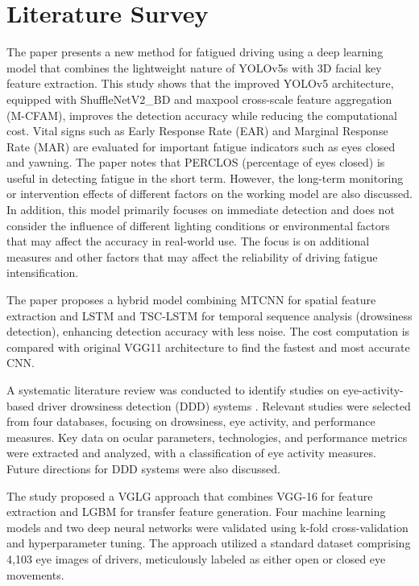 \chapter{Literature Survey}

The paper \cite{ran2023} presents a new method for fatigued driving using a deep learning model that combines the lightweight nature of YOLOv5s with 3D facial key feature extraction. This study shows that the improved YOLOv5 architecture, equipped with ShuffleNetV2\_BD and maxpool cross-scale feature aggregation (M-CFAM), improves the detection accuracy while reducing the computational cost. Vital signs such as Early Response Rate (EAR) and Marginal Response Rate (MAR) are evaluated for important fatigue indicators such as eyes closed and yawning.
The paper notes that PERCLOS (percentage of eyes closed) is useful in detecting fatigue in the short term. However, the long-term monitoring or intervention effects of different factors on the working model are also discussed.
In addition, this model primarily focuses on immediate detection and does not consider the influence of different lighting conditions or environmental factors that may affect the accuracy in real-world use. The focus is on additional measures and other factors that may affect the reliability of driving fatigue intensification.

The paper \cite{guo_markoni} proposes a hybrid model combining MTCNN for spatial feature extraction and LSTM and TSC-LSTM for temporal sequence analysis (drowsiness detection), enhancing detection accuracy with less noise. The cost computation is compared with original VGG11 architecture to find the fastest and most accurate CNN.

A systematic literature review was conducted to identify studies on eye-activity-based driver drowsiness detection (DDD) systems \cite{kolus2024}. Relevant studies were selected from four databases, focusing on drowsiness, eye activity, and performance measures. Key data on ocular parameters, technologies, and performance metrics were extracted and analyzed, with a classification of eye activity measures. Future directions for DDD systems were also discussed.

The study \cite{madni2024} proposed a VGLG approach that combines VGG-16 for feature extraction and LGBM for transfer feature generation. Four machine learning models and two deep neural networks were validated using k-fold cross-validation and hyperparameter tuning. The approach utilized a standard dataset comprising 4,103 eye images of drivers, meticulously labeled as either open or closed eye movements.

